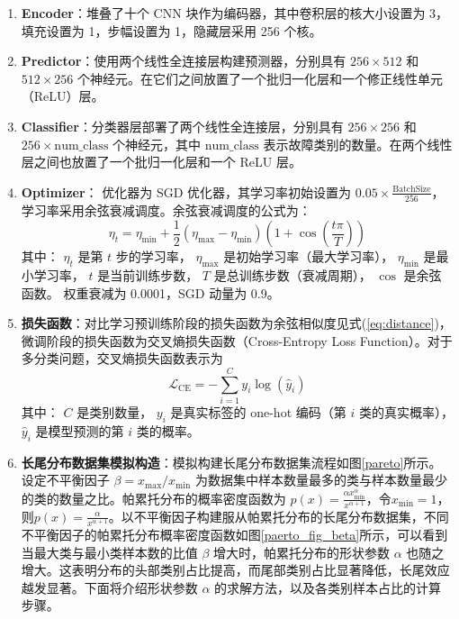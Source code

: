 \documentclass[master]{thesis-uestc}
\begin{document}
\begin{enumerate}[label={(\arabic*)}]
    \item \textbf{Encoder}：堆叠了十个 CNN 块作为编码器，其中卷积层的核大小设置为 3，填充设置为 1，步幅设置为 1，隐藏层采用 256 个核。
    
    \item \textbf{Predictor}：使用两个线性全连接层构建预测器，分别具有 \( 256 \times 512 \) 和 \( 512 \times 256 \) 个神经元。在它们之间放置了一个批归一化层和一个修正线性单元（ReLU）层。

    \item \textbf{Classifier}：分类器层部署了两个线性全连接层，分别具有 \( 256 \times 256 \) 和 \( 256 \times \text{num\_class} \) 个神经元，其中 \(\text{num\_class}\) 表示故障类别的数量。在两个线性层之间也放置了一个批归一化层和一个 ReLU 层。

    \item \textbf{Optimizer}：
        优化器为 SGD 优化器，其学习率初始设置为 \( 0.05 \times \frac{\text{BatchSize}}{256} \)，学习率采用余弦衰减调度。余弦衰减调度的公式为：
        \[
        \eta_t = \eta_{\text{min}} + \frac{1}{2} (\eta_{\text{max}} - \eta_{\text{min}}) \left(1 + \cos\left(\frac{t \pi}{T}\right)\right)
        \]
        其中：
            \(\eta_t\) 是第 \(t\) 步的学习率，
            \(\eta_{\text{max}}\) 是初始学习率（最大学习率），
            \(\eta_{\text{min}}\) 是最小学习率，
            \(t\) 是当前训练步数，
            \(T\) 是总训练步数（衰减周期），
            \(\cos\) 是余弦函数。
        权重衰减为 0.0001，SGD 动量为 0.9。

    \item \textbf{损失函数}：对比学习预训练阶段的损失函数为余弦相似度见式(\ref{eq:distance})，微调阶段的损失函数为交叉熵损失函数（Cross-Entropy Loss Function）。对于多分类问题，交叉熵损失函数表示为
    \begin{equation}
        \mathcal{L}_{\text{CE}} = -\sum_{i=1}^{C} y_i \log(\hat{y}_i)
        \end{equation}        
        其中：
            \( C \) 是类别数量，
            \( y_i \) 是真实标签的 one-hot 编码（第 \( i \) 类的真实概率），
            \( \hat{y}_i \) 是模型预测的第 \( i \) 类的概率。

    \item \textbf{长尾分布数据集模拟构造}：模拟构建长尾分布数据集流程如图\ref{pareto}所示。设定不平衡因子 \(\beta = x_{\text{max}} / x_{\text{min}}\) 为数据集中样本数量最多的类与样本数量最少的类的数量之比。帕累托分布的概率密度函数为 \(p(x) = \frac{\alpha x_{\text{min}}^{\alpha}}{x^{\alpha+1}}\)，令$x_{\text{min}} = 1$，则\(p(x) = \frac{\alpha}{x^{\alpha+1}}\)。以不平衡因子构建服从帕累托分布的长尾分布数据集，不同不平衡因子的帕累托分布概率密度函数如图\ref{paerto_fig_beta}所示，可以看到当最大类与最小类样本数的比值 \(\beta\) 增大时，帕累托分布的形状参数 \(\alpha\) 也随之增大。这表明分布的头部类别占比提高，而尾部类别占比显著降低，长尾效应越发显著。下面将介绍形状参数 \(\alpha\) 的求解方法，以及各类别样本占比的计算步骤。


\end{enumerate}
\end{document}
